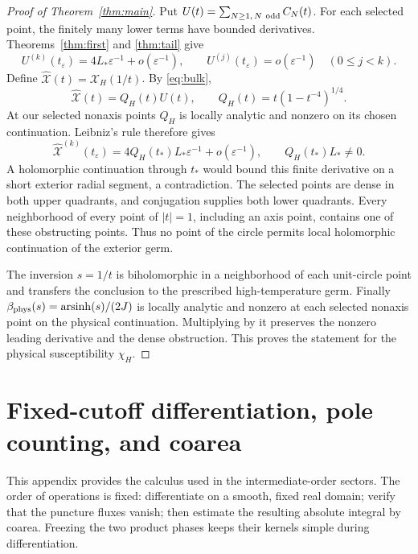 \documentclass[11pt]{article}
\numberwithin{equation}{section}
\theoremstyle{definition}
\newcommand{\eps}{\varepsilon}
\begin{document}
\begin{proof}[Proof of Theorem~\ref{thm:main}]
Put $U(t)=\sum_{N\ge1,\,N\ {\rm odd}}C_N(t)$. For each selected
point, the finitely many lower terms have bounded derivatives.
Theorems~\ref{thm:first} and \ref{thm:tail} give
\[
 U^{(k)}(t_\eps)=4L_*\eps^{-1}+o(\eps^{-1}),
 \qquad U^{(j)}(t_\eps)=o(\eps^{-1})\quad(0\le j<k).
\]
Define $\widehat{\mathcal X}(t)=\mathcal X_H(1/t)$.
By \eqref{eq:bulk},
\[
 \widehat{\mathcal X}(t)=Q_H(t)U(t),\qquad
 Q_H(t)=t(1-t^{-4})^{1/4}.
\]
At our selected nonaxis points $Q_H$ is locally analytic and
nonzero on its chosen continuation. Leibniz's rule therefore gives
\[
 \widehat{\mathcal X}^{(k)}(t_\eps)
 =4Q_H(t_*)L_*\eps^{-1}+o(\eps^{-1}),
 \qquad Q_H(t_*)L_*\ne0.
\]
A holomorphic continuation through $t_*$ would bound this finite
derivative on a short exterior radial segment, a contradiction.
The selected points are dense in both upper quadrants, and
conjugation supplies both lower quadrants. Every neighborhood of
every point of $|t|=1$, including an axis point, contains one of
these obstructing points. Thus no point of the circle permits
local holomorphic continuation of the exterior germ.

The inversion $s=1/t$ is biholomorphic in a neighborhood of each
unit-circle point and transfers the conclusion to the prescribed
high-temperature germ. Finally
$\beta_{\rm phys}(s)=\operatorname{arsinh}(s)/(2J)$ is locally
analytic and nonzero at each selected nonaxis point on the
physical continuation. Multiplying by it preserves the nonzero
leading derivative and the dense obstruction. This proves the
statement for the physical susceptibility $\chi_H$.
\end{proof}


\appendix
\section{Fixed-cutoff differentiation, pole counting, and coarea}
\label{app:lie}

This appendix provides the calculus used in the intermediate-order
sectors. The order of operations is fixed: differentiate on a smooth,
fixed real domain; verify that the puncture fluxes vanish; then estimate
the resulting absolute integral by coarea. Freezing the two product
phases keeps their kernels simple during differentiation.
\end{document}
